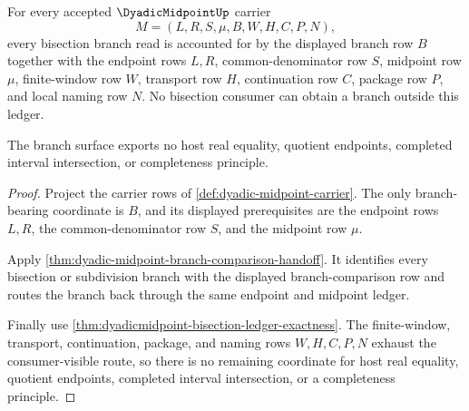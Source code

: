 \begin{theorem}
\label{thm:dyadic-midpoint-branch-ledger-totality}
For every accepted $\DyadicMidpointUp$ carrier
$$
M=(L,R,S,\mu,B,W,H,C,P,N),
$$
every bisection branch read is accounted for by the displayed branch row $B$ together with the endpoint rows $L,R$, common-denominator row $S$, midpoint row $\mu$, finite-window row $W$, transport row $H$, continuation row $C$, package row $P$, and local naming row $N$. No bisection consumer can obtain a branch outside this ledger.

The branch surface exports no host real equality, quotient endpoints, completed interval intersection, or completeness principle.
\end{theorem}
\begin{proof}
Project the carrier rows of \autoref{def:dyadic-midpoint-carrier}. The only branch-bearing coordinate is $B$, and its displayed prerequisites are the endpoint rows $L,R$, the common-denominator row $S$, and the midpoint row $\mu$.

Apply \autoref{thm:dyadic-midpoint-branch-comparison-handoff}. It identifies every bisection or subdivision branch with the displayed branch-comparison row and routes the branch back through the same endpoint and midpoint ledger.

Finally use \autoref{thm:dyadicmidpoint-bisection-ledger-exactness}. The finite-window, transport, continuation, package, and naming rows $W,H,C,P,N$ exhaust the consumer-visible route, so there is no remaining coordinate for host real equality, quotient endpoints, completed interval intersection, or a completeness principle.
\end{proof}

